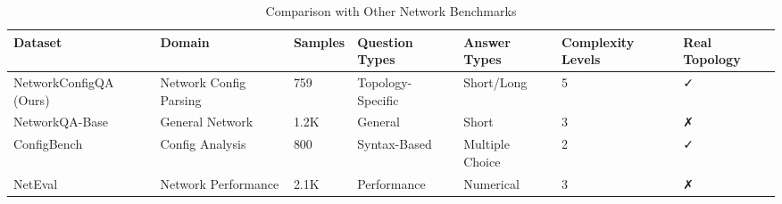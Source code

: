 \begin{table}
\caption{Comparison with Other Network Benchmarks}
\label{tab:benchmark_comparison}
\begin{tabular}{lllllll}
\toprule
Dataset & Domain & Samples & Question Types & Answer Types & Complexity Levels & Real Topology \\
\midrule
NetworkConfigQA (Ours) & Network Config Parsing & 759 & Topology-Specific & Short/Long & 5 & ✓ \\
NetworkQA-Base & General Network & 1.2K & General & Short & 3 & ✗ \\
ConfigBench & Config Analysis & 800 & Syntax-Based & Multiple Choice & 2 & ✓ \\
NetEval & Network Performance & 2.1K & Performance & Numerical & 3 & ✗ \\
\bottomrule
\end{tabular}
\end{table}
